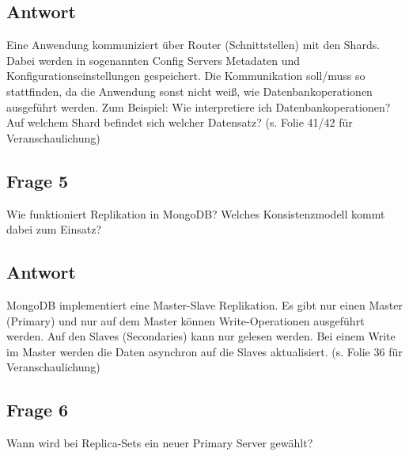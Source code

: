 \subsection*{Antwort}
Eine Anwendung kommuniziert über Router (Schnittstellen) mit den Shards. Dabei werden in sogenannten Config Servers Metadaten und Konfigurationseinstellungen gespeichert. 
Die Kommunikation soll/muss so stattfinden, da die Anwendung sonst nicht weiß, wie Datenbankoperationen ausgeführt werden. Zum Beispiel: Wie interpretiere ich Datenbankoperationen? Auf welchem Shard befindet sich welcher Datensatz? (s. Folie 41/42 für Veranschaulichung)
\subsection*{Frage 5}
Wie funktioniert Replikation in MongoDB? Welches Konsistenzmodell kommt dabei zum Einsatz?
\subsection*{Antwort}
MongoDB implementiert eine Master-Slave Replikation. Es gibt nur einen Master (Primary) und nur auf dem Master können Write-Operationen ausgeführt werden. Auf den Slaves (Secondaries) kann nur gelesen werden. Bei einem Write im Master werden die Daten asynchron auf die Slaves aktualisiert. (s. Folie 36 für Veranschaulichung)

\subsection*{Frage 6}
Wann wird bei Replica-Sets ein neuer Primary Server gewählt?
